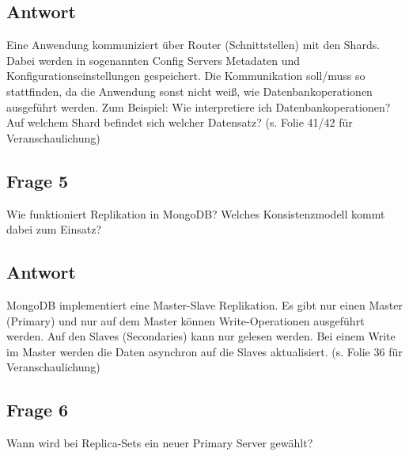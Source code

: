 \subsection*{Antwort}
Eine Anwendung kommuniziert über Router (Schnittstellen) mit den Shards. Dabei werden in sogenannten Config Servers Metadaten und Konfigurationseinstellungen gespeichert. 
Die Kommunikation soll/muss so stattfinden, da die Anwendung sonst nicht weiß, wie Datenbankoperationen ausgeführt werden. Zum Beispiel: Wie interpretiere ich Datenbankoperationen? Auf welchem Shard befindet sich welcher Datensatz? (s. Folie 41/42 für Veranschaulichung)
\subsection*{Frage 5}
Wie funktioniert Replikation in MongoDB? Welches Konsistenzmodell kommt dabei zum Einsatz?
\subsection*{Antwort}
MongoDB implementiert eine Master-Slave Replikation. Es gibt nur einen Master (Primary) und nur auf dem Master können Write-Operationen ausgeführt werden. Auf den Slaves (Secondaries) kann nur gelesen werden. Bei einem Write im Master werden die Daten asynchron auf die Slaves aktualisiert. (s. Folie 36 für Veranschaulichung)

\subsection*{Frage 6}
Wann wird bei Replica-Sets ein neuer Primary Server gewählt?
